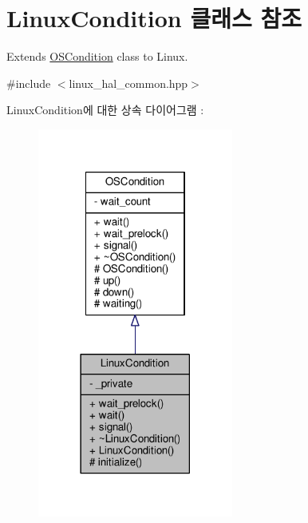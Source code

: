 \hypertarget{class_linux_condition}{}\section{Linux\+Condition 클래스 참조}
\label{class_linux_condition}


Extends \hyperlink{class_o_s_condition}{O\+S\+Condition} class to Linux.  




{\ttfamily \#include $<$linux\+\_\+hal\+\_\+common.\+hpp$>$}



Linux\+Condition에 대한 상속 다이어그램 \+: 
\nopagebreak
\begin{figure}[H]
\begin{center}
\leavevmode
\includegraphics[width=182pt]{class_linux_condition__inherit__graph}
\end{center}
\end{figure}


